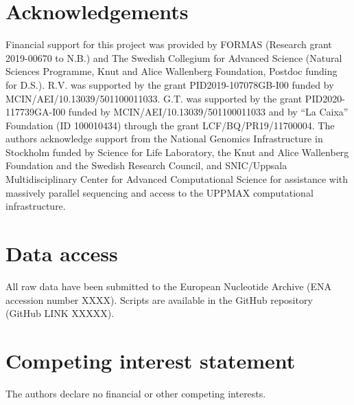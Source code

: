 \documentclass[twocolumn]{bmcart}%
\begin{document}
\begin{backmatter}

\section*{Acknowledgements}%
Financial support for this project was provided by FORMAS (Research grant 2019-00670 to N.B.) and The Swedish Collegium for Advanced Science (Natural Sciences Programme, Knut and Alice Wallenberg Foundation, Postdoc funding for D.S.). R.V. was supported by the grant PID2019-107078GB-I00 funded by MCIN/AEI/10.13039/501100011033. G.T. was supported by the grant PID2020-117739GA-I00 funded by MCIN/AEI/10.13039/501100011033 and by “La Caixa” Foundation (ID 100010434) through the grant LCF/BQ/PR19/11700004. The authors acknowledge support from the National Genomics Infrastructure in Stockholm funded by Science for Life Laboratory, the Knut and Alice Wallenberg Foundation and the Swedish Research Council, and SNIC/Uppsala Multidisciplinary Center for Advanced Computational Science for assistance with massively parallel sequencing and access to the UPPMAX computational infrastructure.

\section*{Data access}%
All raw data have been submitted to the European Nucleotide Archive (ENA accession number XXXX). Scripts are available in the GitHub repository (GitHub LINK XXXXX).

\section*{Competing interest statement}%
The authors declare no financial or other competing interests.





\end{backmatter}
\end{document}
